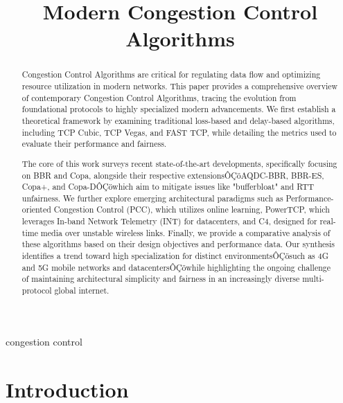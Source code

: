 \documentclass[conference]{IEEEtran}
\begin{document}
\title{Modern Congestion Control Algorithms}

\author{\IEEEauthorblockN{-}
}

\maketitle



\begin{abstract}

Congestion Control Algorithms are critical for regulating data flow and optimizing resource utilization in modern networks. 
This paper provides a comprehensive overview of contemporary Congestion Control Algorithms, tracing the evolution from foundational protocols to highly specialized modern advancements. 
We first establish a theoretical framework by examining traditional loss-based and delay-based algorithms, including TCP Cubic, TCP Vegas, and FAST TCP, while detailing the metrics used to evaluate their performance and fairness.  

The core of this work surveys recent state-of-the-art developments, specifically focusing on BBR and Copa, alongside their respective extensionsÔÇöAQDC-BBR, BBR-ES, Copa+, and Copa-DÔÇöwhich aim to mitigate issues like "bufferbloat" and RTT unfairness. 
We further explore emerging architectural paradigms such as Performance-oriented Congestion Control (PCC), which utilizes online learning, PowerTCP, which leverages In-band Network Telemetry (INT) for datacenters, and C4, designed for real-time media over unstable wireless links. 
Finally, we provide a comparative analysis of these algorithms based on their design objectives and performance data. 
Our synthesis identifies a trend toward high specialization for distinct environmentsÔÇösuch as 4G and 5G mobile networks and datacentersÔÇöwhile highlighting the ongoing challenge of maintaining architectural simplicity and fairness in an increasingly diverse multi-protocol global internet.
 \end{abstract}

\begin{IEEEkeywords}
congestion control
\end{IEEEkeywords}

\section{Introduction}
\end{document}
